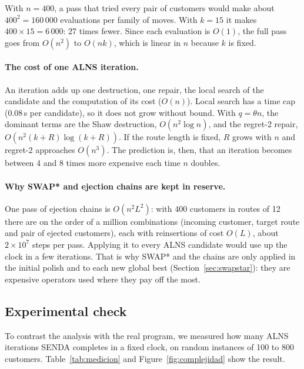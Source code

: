 \documentclass[11pt,a4paper]{article}
\begin{document}
\begin{ejemplo}
With $n=400$, a pass that tried every pair of customers would make about $400^2=160\,000$ evaluations
per family of moves. With $k=15$ it makes $400\times15=6\,000$: 27 times fewer. Since each evaluation
is $O(1)$, the full pass goes from $O(n^2)$ to $O(nk)$, which is linear in $n$ because $k$ is fixed.
\end{ejemplo}

\paragraph{The cost of one ALNS iteration.} An iteration adds up one destruction, one repair, the local
search of the candidate and the computation of its cost ($O(n)$). Local search has a time cap (0.08\,s
per candidate), so it does not grow without bound. With $q=\theta n$, the dominant terms are the Shaw
destruction, $O(n^2\log n)$, and the regret-2 repair, $O(n^2(k+R)\log(k+R))$. If the route length is
fixed, $R$ grows with $n$ and regret-2 approaches $O(n^3)$. The prediction is, then, that an
iteration becomes between 4 and 8 times more expensive each time $n$ doubles.

\paragraph{Why SWAP* and ejection chains are kept in reserve.} One pass of ejection chains is
$O(n^2L^2)$: with 400 customers in routes of 12 there are on the order of a million combinations
(incoming customer, target route and pair of ejected customers), each with reinsertions of cost
$O(L)$, about $2\times10^{7}$ steps per pass. Applying it to every ALNS candidate would use up the
clock in a few iterations. That is why SWAP* and the chains are only applied in the initial polish
and to each new global best (Section~\ref{sec:swapstar}): they are expensive operators used where
they pay off the most.

\subsection{Experimental check}

To contrast the analysis with the real program, we measured how many ALNS iterations SENDA completes
in a fixed clock, on random instances of 100 to 800 customers. Table~\ref{tab:medicion} and
Figure~\ref{fig:complejidad} show the result.
\end{document}
